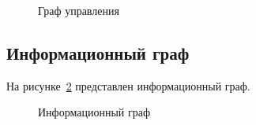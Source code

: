 \begin{figure}[h!]
	\caption{Граф управления}
	\label{fig:control_graph}
\end{figure}

\clearpage

\subsection{Информационный граф}

На рисунке~\ref{fig:info_graph} представлен информационный граф.

\begin{figure}[h!]
	\caption{Информационный граф}
	\label{fig:info_graph}
\end{figure}

